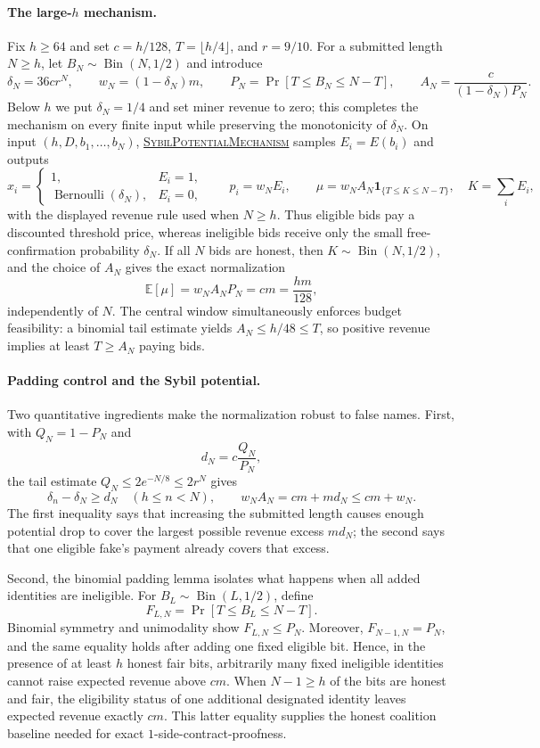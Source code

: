 \documentclass[11pt]{article}
\begin{document}
\paragraph{The large-$h$ mechanism.}
Fix $h\ge64$ and set $c=h/128$, $T=\lfloor h/4\rfloor$, and $r=9/10$.  For a
submitted length $N\ge h$, let $B_N\sim\operatorname{Bin}(N,1/2)$ and
introduce
\[
\delta_N=36cr^N,\qquad w_N=(1-\delta_N)m,
\qquad P_N=\Pr[T\le B_N\le N-T],
\qquad
A_N=\frac{c}{(1-\delta_N)P_N}.
\]
Below $h$ we put $\delta_N=1/4$ and set miner revenue to zero; this completes
the mechanism on every finite input while preserving the monotonicity of
$\delta_N$.  On input $(h,D,b_1,\ldots,b_N)$,
\hyperref[alg:sybil-potential-mechanism]{\textsc{SybilPotentialMechanism}}
samples $E_i=E(b_i)$ and outputs
\[
x_i=
\begin{cases}
1,&E_i=1,\\
\operatorname{Bernoulli}(\delta_N),&E_i=0,
\end{cases}
\qquad
p_i=w_NE_i,
\qquad
\mu=w_NA_N\mathbf{1}_{\{T\le K\le N-T\}},
\quad K=\sum_iE_i,
\]
with the displayed revenue rule used when $N\ge h$.  Thus eligible bids pay a
discounted threshold price, whereas ineligible bids receive only the small
free-confirmation probability $\delta_N$.  If all $N$ bids are honest, then
$K\sim\operatorname{Bin}(N,1/2)$, and the choice of $A_N$ gives the exact
normalization
\[
\mathbb{E}[\mu]=w_NA_NP_N=cm=\frac{hm}{128},
\]
independently of $N$.  The central window simultaneously enforces budget
feasibility: a binomial tail estimate yields $A_N\le h/48\le T$, so positive
revenue implies at least $T\ge A_N$ paying bids.

\paragraph{Padding control and the Sybil potential.}
Two quantitative ingredients make the normalization robust to false names.
First, with $Q_N=1-P_N$ and
\[
d_N=c\frac{Q_N}{P_N},
\]
the tail estimate $Q_N\le2e^{-N/8}\le2r^N$ gives
\begin{equation}
\delta_n-\delta_N\ge d_N\quad(h\le n<N),
\qquad
w_NA_N=cm+md_N\le cm+w_N.
\label{eq:overview-potential}
\end{equation}
The first inequality says that increasing the submitted length causes enough
potential drop to cover the largest possible revenue excess $md_N$; the
second says that one eligible fake's payment already covers that excess.

Second, the binomial padding lemma isolates what happens when all added
identities are ineligible.  For $B_L\sim\operatorname{Bin}(L,1/2)$, define
\[
F_{L,N}=\Pr[T\le B_L\le N-T].
\]
Binomial symmetry and unimodality show $F_{L,N}\le P_N$.  Moreover,
$F_{N-1,N}=P_N$, and the same equality holds after adding one fixed eligible
bit.  Hence, in the presence of at least $h$ honest fair bits, arbitrarily many
fixed ineligible identities cannot raise expected revenue above $cm$.  When
$N-1\ge h$ of the bits are honest and fair, the eligibility status of one
additional designated identity leaves expected revenue exactly $cm$.  This
latter equality supplies the honest coalition baseline needed for exact
$1$-side-contract-proofness.
\end{document}

